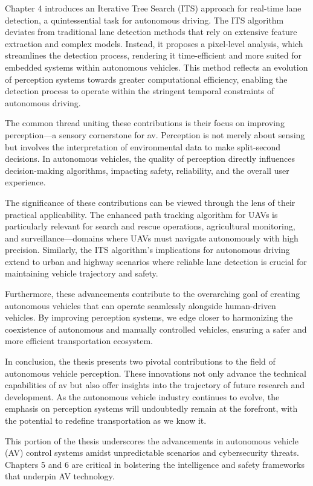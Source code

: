 Chapter 4 introduces an Iterative Tree Search (ITS) approach for real-time lane detection, a quintessential task for autonomous driving. The ITS algorithm deviates from traditional lane detection methods that rely on extensive feature extraction and complex models. Instead, it proposes a pixel-level analysis, which streamlines the detection process, rendering it time-efficient and more suited for embedded systems within autonomous vehicles. This method reflects an evolution of perception systems towards greater computational efficiency, enabling the detection process to operate within the stringent temporal constraints of autonomous driving.

The common thread uniting these contributions is their focus on improving perception—a sensory cornerstone for \gls{av}. Perception is not merely about sensing but involves the interpretation of environmental data to make split-second decisions. In autonomous vehicles, the quality of perception directly influences decision-making algorithms, impacting safety, reliability, and the overall user experience.

The significance of these contributions can be viewed through the lens of their practical applicability. The enhanced path tracking algorithm for UAVs is particularly relevant for search and rescue operations, agricultural monitoring, and surveillance—domains where UAVs must navigate autonomously with high precision. Similarly, the ITS algorithm's implications for autonomous driving extend to urban and highway scenarios where reliable lane detection is crucial for maintaining vehicle trajectory and safety.

Furthermore, these advancements contribute to the overarching goal of creating autonomous vehicles that can operate seamlessly alongside human-driven vehicles. By improving perception systems, we edge closer to harmonizing the coexistence of autonomous and manually controlled vehicles, ensuring a safer and more efficient transportation ecosystem.

In conclusion, the thesis presents two pivotal contributions to the field of autonomous vehicle perception. These innovations not only advance the technical capabilities of \gls{av} but also offer insights into the trajectory of future research and development. As the autonomous vehicle industry continues to evolve, the emphasis on perception systems will undoubtedly remain at the forefront, with the potential to redefine transportation as we know it.


This portion of the thesis underscores the advancements in autonomous vehicle (AV) control systems amidst unpredictable scenarios and cybersecurity threats. Chapters 5 and 6 are critical in bolstering the intelligence and safety frameworks that underpin AV technology.

